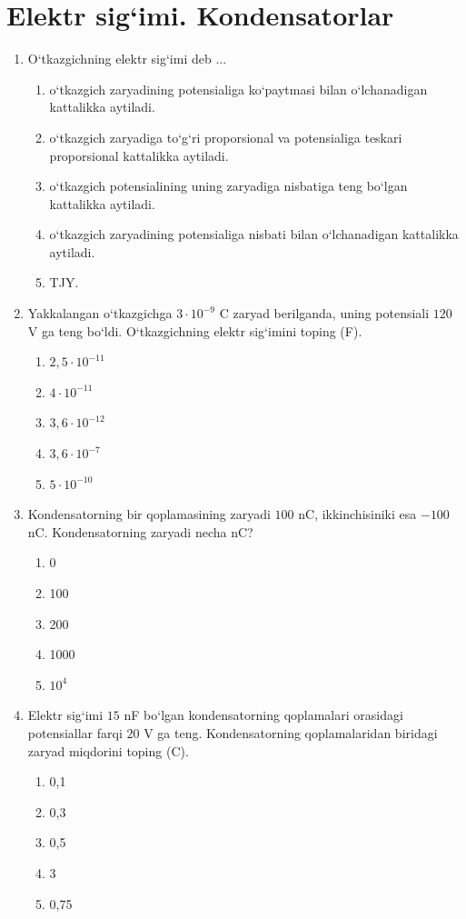 \section{Elektr sig`imi. Kondensatorlar}

\begin{enumerate}

\item O‘tkazgichning elektr sig‘imi deb ...
\begin{enumerate}[label=\Alph*)]
\item o‘tkazgich zaryadining potensialiga ko‘paytmasi bilan o‘lchanadigan kattalikka aytiladi.
\item o‘tkazgich zaryadiga to‘g‘ri proporsional va potensialiga teskari proporsional kattalikka aytiladi.
\item o‘tkazgich potensialining uning zaryadiga nisbatiga teng bo‘lgan kattalikka aytiladi.
\item o‘tkazgich zaryadining potensialiga nisbati bilan o‘lchanadigan kattalikka aytiladi.
\item TJY.
\end{enumerate}

\item Yakkalangan o‘tkazgichga $3\cdot10^{-9}$ C zaryad berilganda, uning potensiali $120$ V ga teng bo‘ldi. O‘tkazgichning elektr sig‘imini toping (F).
\begin{enumerate}[label=\Alph*)]
\item $2,5\cdot10^{-11}$
\item $4\cdot10^{-11}$
\item $3,6\cdot10^{-12}$
\item $3,6\cdot10^{-7}$
\item $5\cdot10^{-10}$
\end{enumerate}

\item Kondensatorning bir qoplamasining zaryadi $100$ nC, ikkinchisiniki esa $-100$ nC. Kondensatorning zaryadi necha nC?
\begin{enumerate}[label=\Alph*)]
\item 0
\item 100
\item 200
\item 1000
\item $10^4$
\end{enumerate}

\item Elektr sig‘imi $15$ nF bo‘lgan kondensatorning qoplamalari orasidagi potensiallar farqi $20$ V ga teng. Kondensatorning qoplamalaridan biridagi zaryad miqdorini toping (C).
\begin{enumerate}[label=\Alph*)]
\item 0,1
\item 0,3
\item 0,5
\item 3
\item 0,75
\end{enumerate}


\end{enumerate}
